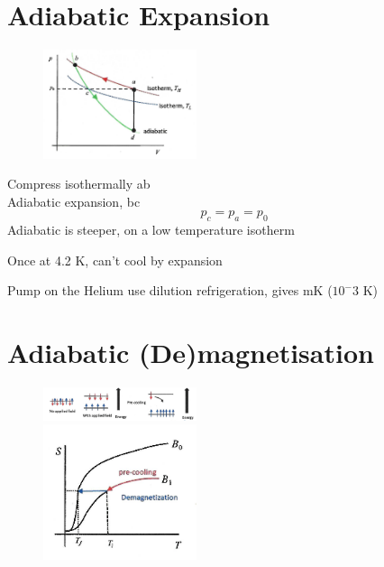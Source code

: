 \documentclass[a4paper, 11pt, normalem]{report}
\begin{document}
\section{Adiabatic Expansion}
\begin{figure}
    \begin{center}
        \vspace{-30pt}
        \includegraphics[width=0.4\textwidth]{AdiExp.png}
        \vspace{-70pt}
    \end{center}
\end{figure}

Compress isothermally ab \\
Adiabatic expansion, bc
\begin{equation*}
    p_c = p_a = p_0
\end{equation*}
Adiabatic is steeper, on a low temperature isotherm

Once at 4.2 K, can't cool by expansion

Pump on the Helium use dilution refrigeration, gives mK ($10^-3$ K)

\section{Adiabatic (De)magnetisation}
\begin{figure}
    \begin{center}
        \includegraphics[width=0.4\textwidth]{Magnets1.png} \\
        \includegraphics[width=0.4\textwidth]{Magnets2.png}
    \end{center}
\end{figure}
\end{document}
